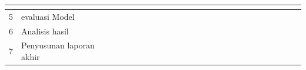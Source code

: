 \begin{table}[H]
{\begin{tabular}{|l|l|llllllllllllllllllllllll|}
    \multicolumn{1}{l|}{} &
    \multicolumn{1}{l|}{} &
    \multicolumn{1}{l|}{} &
    \multicolumn{1}{l|}{} &
    \multicolumn{1}{l|}{} &
    \multicolumn{1}{l|}{} &
     \\ \hline
  5 &
    evaluasi Model  &
    \multicolumn{1}{l|}{} &
    \multicolumn{1}{l|}{} &
    \multicolumn{1}{l|}{} &
    \multicolumn{1}{l|}{} &
    \multicolumn{1}{l|}{} &
    \multicolumn{1}{l|}{} &
    \multicolumn{1}{l|}{} &
    \multicolumn{1}{l|}{} &
    \multicolumn{1}{l|}{} &
    \multicolumn{1}{l|}{} &
    \multicolumn{1}{l|}{} &
    \multicolumn{1}{l|}{} &
    \multicolumn{1}{l|}{}&
    \multicolumn{1}{l|}{} &
    \multicolumn{1}{l|}{} &
    \multicolumn{1}{l|}{\cellcolor[HTML]{333333}} &
    \multicolumn{1}{l|}{\cellcolor[HTML]{333333}} &
    \multicolumn{1}{l|}{\cellcolor[HTML]{333333}} &
    \multicolumn{1}{l|}{} &
    \multicolumn{1}{l|}{} &
    \multicolumn{1}{l|}{} &
    \multicolumn{1}{l|}{} &
    \multicolumn{1}{l|}{} &
     \\ \hline
  6 &
    Analisis hasil &
    \multicolumn{1}{l|}{} &
    \multicolumn{1}{l|}{} &
    \multicolumn{1}{l|}{} &
    \multicolumn{1}{l|}{} &
    \multicolumn{1}{l|}{} &
    \multicolumn{1}{l|}{} &
    \multicolumn{1}{l|}{} &
    \multicolumn{1}{l|}{} &
    \multicolumn{1}{l|}{} &
    \multicolumn{1}{l|}{} &
    \multicolumn{1}{l|}{} &
    \multicolumn{1}{l|}{} &
    \multicolumn{1}{l|}{} &
    \multicolumn{1}{l|}{} &
    \multicolumn{1}{l|}{} &
    \multicolumn{1}{l|}{} &
    \multicolumn{1}{l|}{} &
    \multicolumn{1}{l|}{\cellcolor[HTML]{333333}} &
    \multicolumn{1}{l|}{\cellcolor[HTML]{333333}} &
    \multicolumn{1}{l|}{\cellcolor[HTML]{333333}} &
    \multicolumn{1}{l|}{} &
    \multicolumn{1}{l|}{} &
    \multicolumn{1}{l|}{} &
     \\ \hline
  7 &
    Penyusunan laporan akhir &
    \multicolumn{1}{l|}{} &
    \multicolumn{1}{l|}{} &
    \multicolumn{1}{l|}{} &
    \multicolumn{1}{l|}{} &
    \multicolumn{1}{l|}{} &
    \multicolumn{1}{l|}{} &
    \multicolumn{1}{l|}{} &
    \multicolumn{1}{l|}{} &
    \multicolumn{1}{l|}{} &
    \multicolumn{1}{l|}{} &
    \multicolumn{1}{l|}{} &
    \multicolumn{1}{l|}{} &
    \multicolumn{1}{l|}{} &
    \multicolumn{1}{l|}{} &
    \multicolumn{1}{l|}{} &
    \multicolumn{1}{l|}{} &
    \multicolumn{1}{l|}{} &
    \multicolumn{1}{l|}{} &
    \multicolumn{1}{l|}{} &
    \multicolumn{1}{l|}{\cellcolor[HTML]{333333}} &
    \multicolumn{1}{l|}{\cellcolor[HTML]{333333}} &
    \multicolumn{1}{l|}{\cellcolor[HTML]{333333}} &
    \multicolumn{1}{l|}{\cellcolor[HTML]{333333}} &
     \\ \hline
  \end{tabular}%
  }
  \end{table}


